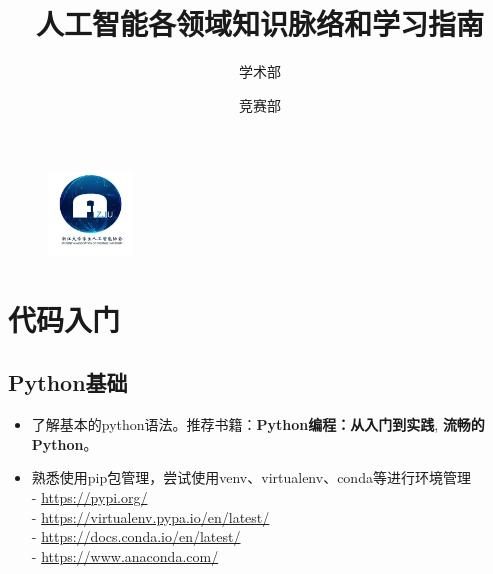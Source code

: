 \documentclass[lang=cn,11pt,a4paper]{eleganttemplate}
\title{人工智能各领域知识脉络和学习指南}
\institute{浙江大学学生人工智能协会\\项目地址:\href{https://github.com/zjuai/AI_Learning_Guidance}{https://github.com/zjuai/AI\_Learning\_Guidance}}
\author{学术部 \and 竞赛部}
\date{\zhtoday}
\begin{document}
\maketitle
\begin{figure}[htbp]
  \vspace{-8cm}
  \centering
  \includegraphics[width=0.2\textwidth]{image/logo.jpg}
\end{figure}

\vspace{3cm}
\section{代码入门}
\subsection{Python基础}
\begin{itemize}
\item 了解基本的python语法。推荐书籍：\textbf{Python编程：从入门到实践}, \textbf{流畅的Python}。
\item 熟悉使用pip包管理，尝试使用venv、virtualenv、conda等进行环境管理 \\
  - \href{https://pypi.org/}{https://pypi.org/} \\
  - \href{https://virtualenv.pypa.io/en/latest/}{https://virtualenv.pypa.io/en/latest/} \\
  - \href{https://docs.conda.io/en/latest/}{https://docs.conda.io/en/latest/} \\
  - \href{https://www.anaconda.com/}{https://www.anaconda.com/} \\
\end{itemize}
\end{document}
